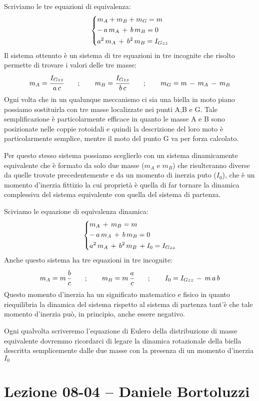 Scriviamo le tre equazioni di equivalenza:
\[
\begin{dcases}
m_A + m_B + m_G = m\\
-\,a\,m_A\,+\,b\,m_B = 0\\
a^2\,m_A\,+\,b^2\,m_B = I_{Gzz}
\end{dcases}
\]
Il sistema ottenuto è un sistema di tre equazioni in tre incognite che risolto permette di trovare i valori delle tre masse:
\[
m_A = \cfrac{I_{Gzz}}{a\,c}\qquad;\qquad m_B = \cfrac{I_{Gzz}}{b\,c}\qquad;\qquad m_G = m\,-\,m_A\,-\,m_B
\]
Ogni volta che in un qualunque meccanismo ci sia una biella in moto piano possiamo sostituirla con tre masse localizzate nei punti A,B e G. Tale semplificazione è particolarmente efficace in quanto le masse A e B sono posizionate nelle coppie rotoidali e quindi la descrizione del loro moto è particolarmente semplice, mentre il moto del punto G va per forza calcolato.

Per questo stesso sistema possiamo sceglierlo con un sistema dinamicamente equivalente che è formato da solo due masse ($m_A$ e $m_B$) che risulteranno diverse da quelle trovate precedentemente e da un momento di inerzia puto ($I_0$), che è un momento d'inerzia fittizio la cui proprietà è quella di far tornare la dinamica complessiva del sistema equivalente con quella del sistema di partenza.

Sciviamo le equazione di equivalenza dinamica:
\[
\begin{dcases}
m_A\,+\,m_B = m\\
-\,a\,m_A\,+\,b\,m_B = 0\\
a^2\,m_A\,+\,b^2\,m_B\,+I_0=I_{Gzz}
\end{dcases}
\]
Anche questo sistema ha tre equazioni in tre incognite:
\[
m_A = m\,\cfrac{b}{c}\qquad;\qquad m_B = m\,\cfrac{a}{c}\qquad;\qquad I_0 = I_{Gzz}\,-\,m\,a\,b
\]
Questo momento d'inerzia ha un significato matematico e fisico in quanto riequilibria la dinamica del sistema rispetto al sistema di partenza tant'è che tale momento d'inerzia può, in principio, anche essere negativo.

Ogni qualvolta scriveremo l'equazione di Eulero della distribuzione di masse equivalente dovremmo ricordarci di legare la dinamica rotazionale della biella descritta semplicemente dalle due masse con la presenza di un momento d'inerzia $I_0$

\section{Lezione 08-04 -- Daniele Bortoluzzi}

